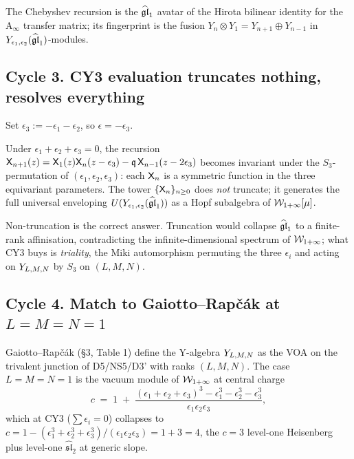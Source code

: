 The Chebyshev recursion is the $\widehat{\mathfrak{gl}}_1$ avatar of the Hirota bilinear
identity for the A$_\infty$ transfer matrix; its fingerprint is the
fusion $Y_n \otimes Y_1 = Y_{n+1} \oplus Y_{n-1}$ in $Y_{\epsilon_1,\epsilon_2}(\widehat{\mathfrak{gl}}_1)$-modules.

\subsection{Cycle 3. CY3 evaluation truncates nothing, resolves everything}

Set $\epsilon_3 := -\epsilon_1 - \epsilon_2$, so $\epsilon = -\epsilon_3$.

\begin{proposition}
Under $\epsilon_1+\epsilon_2+\epsilon_3=0$, the recursion
$\mathsf{X}_{n+1}(z) = \mathsf{X}_1(z)\mathsf{X}_n(z-\epsilon_3) - \mathfrak{q}\,\mathsf{X}_{n-1}(z-2\epsilon_3)$
becomes invariant under the $S_3$-permutation of
$(\epsilon_1,\epsilon_2,\epsilon_3)$: each $\mathsf{X}_n$ is a symmetric
function in the three equivariant parameters. The tower
$\{\mathsf{X}_n\}_{n\geq 0}$ does \emph{not} truncate; it generates the full
universal enveloping $U(Y_{\epsilon_1,\epsilon_2}(\widehat{\mathfrak{gl}}_1))$ as a Hopf subalgebra of
$\mathcal{W}_{1+\infty}[\mu]$.
\end{proposition}

Non-truncation is the correct answer. Truncation would collapse
$\widehat{\mathfrak{gl}}_1$ to a finite-rank affinisation, contradicting the
infinite-dimensional spectrum of $\mathcal{W}_{1+\infty}$; what CY3 buys is
\emph{triality}, the Miki automorphism permuting the three $\epsilon_i$
and acting on $Y_{L,M,N}$ by $S_3$ on $(L,M,N)$.

\subsection{Cycle 4. Match to Gaiotto--Rap\v{c}\'ak at $L=M=N=1$}

Gaiotto--Rap\v{c}\'ak \cite{GaiottoRapcak2017} (\S3, Table 1) define the
Y-algebra $Y_{L,M,N}$ as the VOA on the trivalent junction of D5/NS5/D3'
with ranks $(L,M,N)$. The case $L=M=N=1$ is the vacuum module of
$\mathcal{W}_{1+\infty}$ at central charge
\begin{equation}
c \;=\; 1 \;+\; \frac{(\epsilon_1+\epsilon_2+\epsilon_3)^3 - \epsilon_1^3 - \epsilon_2^3 - \epsilon_3^3}
{\epsilon_1 \epsilon_2 \epsilon_3},
\end{equation}
which at CY3 ($\sum\epsilon_i=0$) collapses to $c=1-(\epsilon_1^3+\epsilon_2^3+\epsilon_3^3)/(\epsilon_1\epsilon_2\epsilon_3)=1+3=4$,
the $c=3$ level-one Heisenberg plus level-one $\widehat{\mathfrak{sl}}_2$ at generic slope.

